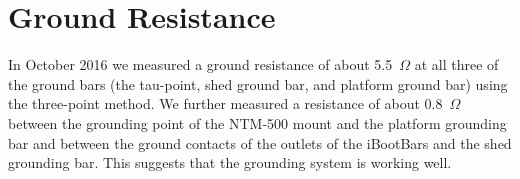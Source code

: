 \section{Ground Resistance}

In October 2016 we measured a ground resistance of about 5.5~$\Omega$ at all three of the ground bars (the tau-point, shed ground bar, and platform ground bar) using the three-point method. We further measured a resistance of about 0.8~$\Omega$ between the grounding point of the NTM-500 mount and the platform grounding bar and between the ground contacts of the outlets of the iBootBars and the shed grounding bar. This suggests that the grounding system is working well.

\fi
